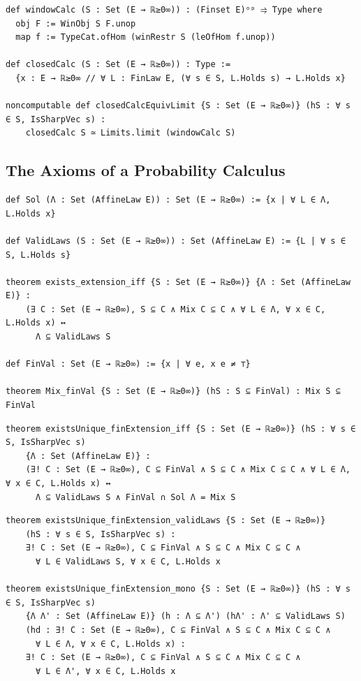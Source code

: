 \label{lean:window-limit}
\begin{lstlisting}
def windowCalc (S : Set (E → ℝ≥0∞)) : (Finset E)ᵒᵖ ⥤ Type where
  obj F := WinObj S F.unop
  map f := TypeCat.ofHom (winRestr S (leOfHom f.unop))

def closedCalc (S : Set (E → ℝ≥0∞)) : Type :=
  {x : E → ℝ≥0∞ // ∀ L : FinLaw E, (∀ s ∈ S, L.Holds s) → L.Holds x}

noncomputable def closedCalcEquivLimit {S : Set (E → ℝ≥0∞)} (hS : ∀ s ∈ S, IsSharpVec s) :
    closedCalc S ≃ Limits.limit (windowCalc S)
\end{lstlisting}

\subsection{The Axioms of a Probability Calculus}

\label{lean:exists-extension}
\begin{lstlisting}
def Sol (Λ : Set (AffineLaw E)) : Set (E → ℝ≥0∞) := {x | ∀ L ∈ Λ, L.Holds x}

def ValidLaws (S : Set (E → ℝ≥0∞)) : Set (AffineLaw E) := {L | ∀ s ∈ S, L.Holds s}

theorem exists_extension_iff {S : Set (E → ℝ≥0∞)} {Λ : Set (AffineLaw E)} :
    (∃ C : Set (E → ℝ≥0∞), S ⊆ C ∧ Mix C ⊆ C ∧ ∀ L ∈ Λ, ∀ x ∈ C, L.Holds x) ↔
      Λ ⊆ ValidLaws S

def FinVal : Set (E → ℝ≥0∞) := {x | ∀ e, x e ≠ ⊤}

theorem Mix_finVal {S : Set (E → ℝ≥0∞)} (hS : S ⊆ FinVal) : Mix S ⊆ FinVal
\end{lstlisting}

\label{lean:existsunique-finextension}
\begin{lstlisting}
theorem existsUnique_finExtension_iff {S : Set (E → ℝ≥0∞)} (hS : ∀ s ∈ S, IsSharpVec s)
    {Λ : Set (AffineLaw E)} :
    (∃! C : Set (E → ℝ≥0∞), C ⊆ FinVal ∧ S ⊆ C ∧ Mix C ⊆ C ∧ ∀ L ∈ Λ, ∀ x ∈ C, L.Holds x) ↔
      Λ ⊆ ValidLaws S ∧ FinVal ∩ Sol Λ = Mix S
\end{lstlisting}

\label{lean:finextension-mono}
\begin{lstlisting}
theorem existsUnique_finExtension_validLaws {S : Set (E → ℝ≥0∞)}
    (hS : ∀ s ∈ S, IsSharpVec s) :
    ∃! C : Set (E → ℝ≥0∞), C ⊆ FinVal ∧ S ⊆ C ∧ Mix C ⊆ C ∧
      ∀ L ∈ ValidLaws S, ∀ x ∈ C, L.Holds x

theorem existsUnique_finExtension_mono {S : Set (E → ℝ≥0∞)} (hS : ∀ s ∈ S, IsSharpVec s)
    {Λ Λ' : Set (AffineLaw E)} (h : Λ ⊆ Λ') (hΛ' : Λ' ⊆ ValidLaws S)
    (hd : ∃! C : Set (E → ℝ≥0∞), C ⊆ FinVal ∧ S ⊆ C ∧ Mix C ⊆ C ∧
      ∀ L ∈ Λ, ∀ x ∈ C, L.Holds x) :
    ∃! C : Set (E → ℝ≥0∞), C ⊆ FinVal ∧ S ⊆ C ∧ Mix C ⊆ C ∧
      ∀ L ∈ Λ', ∀ x ∈ C, L.Holds x
\end{lstlisting}

